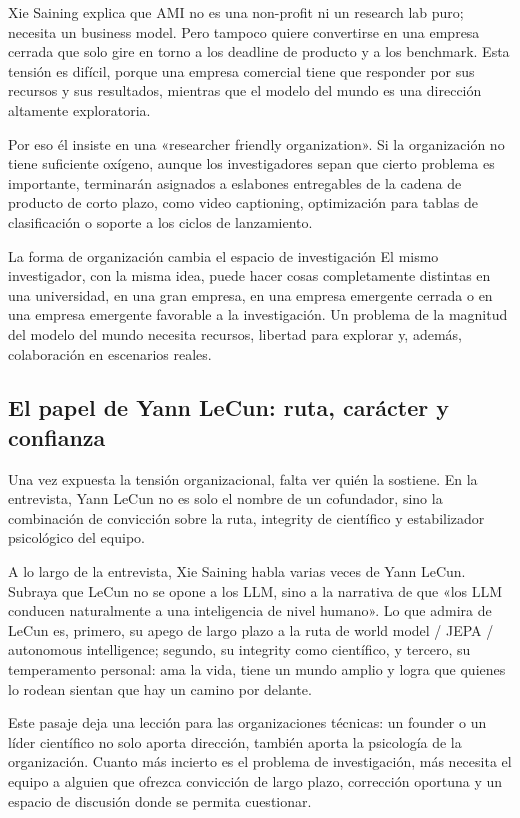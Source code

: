 Xie Saining explica que AMI no es una non-profit ni un research lab puro; necesita un business model. Pero tampoco quiere convertirse en una empresa cerrada que solo gire en torno a los deadline de producto y a los benchmark. Esta tensión es difícil, porque una empresa comercial tiene que responder por sus recursos y sus resultados, mientras que el modelo del mundo es una dirección altamente exploratoria.

Por eso él insiste en una «researcher friendly organization». Si la organización no tiene suficiente oxígeno, aunque los investigadores sepan que cierto problema es importante, terminarán asignados a eslabones entregables de la cadena de producto de corto plazo, como video captioning, optimización para tablas de clasificación o soporte a los ciclos de lanzamiento.

\begin{importantbox}{La forma de organización cambia el espacio de investigación}
El mismo investigador, con la misma idea, puede hacer cosas completamente distintas en una universidad, en una gran empresa, en una empresa emergente cerrada o en una empresa emergente favorable a la investigación. Un problema de la magnitud del modelo del mundo necesita recursos, libertad para explorar y, además, colaboración en escenarios reales.
\end{importantbox}

\subsection{El papel de Yann LeCun: ruta, carácter y confianza}

Una vez expuesta la tensión organizacional, falta ver quién la sostiene. En la entrevista, Yann LeCun no es solo el nombre de un cofundador, sino la combinación de convicción sobre la ruta, integrity de científico y estabilizador psicológico del equipo.

A lo largo de la entrevista, Xie Saining habla varias veces de Yann LeCun. Subraya que LeCun no se opone a los LLM, sino a la narrativa de que «los LLM conducen naturalmente a una inteligencia de nivel humano». Lo que admira de LeCun es, primero, su apego de largo plazo a la ruta de world model / JEPA / autonomous intelligence; segundo, su integrity como científico, y tercero, su temperamento personal: ama la vida, tiene un mundo amplio y logra que quienes lo rodean sientan que hay un camino por delante.

Este pasaje deja una lección para las organizaciones técnicas: un founder o un líder científico no solo aporta dirección, también aporta la psicología de la organización. Cuanto más incierto es el problema de investigación, más necesita el equipo a alguien que ofrezca convicción de largo plazo, corrección oportuna y un espacio de discusión donde se permita cuestionar.

